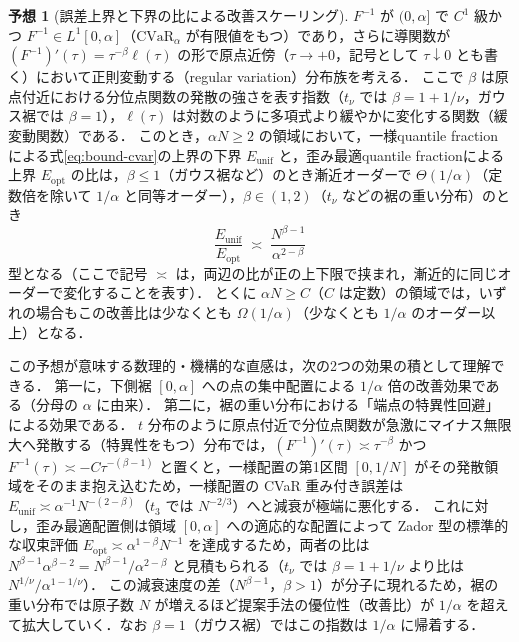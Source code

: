 \documentclass[a4paper,10pt]{jsarticle}
\theoremstyle{definition}
\newtheorem{conjecture}{予想}[section]
\newcommand{\CVaR}{\mathrm{CVaR}}
\newcommand{\Finv}{F^{-1}}
\begin{document}
\begin{conjecture}[誤差上界と下界の比による改善スケーリング]
\label{conj:alpha}
$\Finv$ が $(0,\alpha]$ で $C^1$ 級かつ $\Finv\in L^1[0,\alpha]$（$\CVaR_\alpha$ が有限値をもつ）であり，さらに導関数が $(\Finv)'(\tau)=\tau^{-\beta}\ell(\tau)$ の形で原点近傍（$\tau\to+0$，記号として $\tau\downarrow0$ とも書く）において正則変動する（regular variation）分布族を考える．
ここで $\beta$ は原点付近における分位点関数の発散の強さを表す指数（$t_\nu$ では $\beta=1+1/\nu$，ガウス裾では $\beta=1$），$\ell(\tau)$ は対数のように多項式より緩やかに変化する関数（緩変動関数）である．
このとき，$\alpha N\ge2$ の領域において，一様quantile fractionによる式\eqref{eq:bound-cvar}の上界の下界 $E_{\mathrm{unif}}$ と，歪み最適quantile fractionによる上界 $E_{\mathrm{opt}}$ の比は，$\beta\le1$（ガウス裾など）のとき漸近オーダーで $\Theta(1/\alpha)$（定数倍を除いて $1/\alpha$ と同等オーダー），$\beta\in(1,2)$（$t_\nu$ などの裾の重い分布）のとき
\begin{equation}
  \frac{E_{\mathrm{unif}}}{E_{\mathrm{opt}}} \;\asymp\; \frac{N^{\beta-1}}{\alpha^{2-\beta}}
  \label{eq:conj-scaling}
\end{equation}
型となる（ここで記号 $\asymp$ は，両辺の比が正の上下限で挟まれ，漸近的に同じオーダーで変化することを表す）．
とくに $\alpha N\ge C$（$C$ は定数）の領域では，いずれの場合もこの改善比は少なくとも $\Omega(1/\alpha)$（少なくとも $1/\alpha$ のオーダー以上）となる．
\end{conjecture}
この予想が意味する数理的・機構的な直感は，次の2つの効果の積として理解できる．
第一に，下側裾 $[0,\alpha]$ への点の集中配置による $1/\alpha$ 倍の改善効果である（分母の $\alpha$ に由来）．
第二に，裾の重い分布における「端点の特異性回避」による効果である．
$t$ 分布のように原点付近で分位点関数が急激にマイナス無限大へ発散する（特異性をもつ）分布では，$(\Finv)'(\tau)\asymp\tau^{-\beta}$ かつ $\Finv(\tau)\asymp -C\tau^{-(\beta-1)}$ と置くと，一様配置の第1区間 $[0,1/N]$ がその発散領域をそのまま抱え込むため，一様配置の CVaR 重み付き誤差は $E_{\mathrm{unif}}\asymp\alpha^{-1}N^{-(2-\beta)}$（$t_3$ では $N^{-2/3}$）へと減衰が極端に悪化する．
これに対し，歪み最適配置側は領域 $[0,\alpha]$ への適応的な配置によって Zador 型の標準的な収束評価 $E_{\mathrm{opt}}\asymp\alpha^{1-\beta}N^{-1}$ を達成するため，両者の比は $N^{\beta-1}\alpha^{\beta-2}=N^{\beta-1}/\alpha^{2-\beta}$ と見積もられる（$t_\nu$ では $\beta=1+1/\nu$ より比は $N^{1/\nu}/\alpha^{1-1/\nu}$）．
この減衰速度の差（$N^{\beta-1}$，$\beta>1$）が分子に現れるため，裾の重い分布では原子数 $N$ が増えるほど提案手法の優位性（改善比）が $1/\alpha$ を超えて拡大していく．なお $\beta=1$（ガウス裾）ではこの指数は $1/\alpha$ に帰着する．
\end{document}
